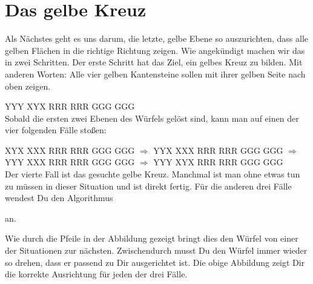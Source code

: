 \section{Das gelbe Kreuz}
\parbox{0.7\linewidth}{
  Als Nächstes geht es uns darum, die letzte, gelbe Ebene so auszurichten, dass alle gelben Flächen in die richtige Richtung zeigen. 
  Wie angekündigt machen wir das in zwei Schritten.
  Der erste Schritt hat das Ziel, ein gelbes Kreuz zu bilden.
  Mit anderen Worten: Alle vier gelben Kantensteine sollen mit ihrer gelben Seite nach oben zeigen.
}
\RubikCubeGreyAll%
            {Y}{Y}{Y}
            {X}{Y}{X}%
               {R}{R}{R}
	       {R}{R}{R}%
	       {G}{G}{G}
	       {G}{G}{G}%
\\[1em]

Sobald die ersten zwei Ebenen des Würfels gelöst sind, kann man auf einen der vier folgenden Fälle stoßen:

\RubikCubeGreyAll%
            {X}{Y}{X}
            {X}{X}{X}%
               {R}{R}{R}
	       {R}{R}{R}%
	       {G}{G}{G}
	       {G}{G}{G}%
$\Longrightarrow$
\RubikCubeGreyAll%
            {Y}{Y}{X}
            {X}{X}{X}%
               {R}{R}{R}
	       {R}{R}{R}%
	       {G}{G}{G}
	       {G}{G}{G}%
$\Longrightarrow$
\RubikCubeGreyAll%
            {Y}{Y}{Y}
            {X}{X}{X}%
               {R}{R}{R}
	       {R}{R}{R}%
	       {G}{G}{G}
	       {G}{G}{G}%
$\Longrightarrow$
\RubikCubeGreyAll%
            {Y}{Y}{Y}
            {X}{Y}{X}%
               {R}{R}{R}
	       {R}{R}{R}%
	       {G}{G}{G}
	       {G}{G}{G}%
\\[1em]

Der vierte Fall ist das gesuchte gelbe Kreuz.
Manchmal ist man ohne etwas tun zu müssen in dieser Situation und ist direkt fertig.
Für die anderen drei Fälle wendest Du den Algorithmus \\[1em]
\begin{center}
\end{center}
an.

Wie durch die Pfeile in der Abbildung gezeigt bringt dies den Würfel von einer der Situationen zur nächsten.
Zwischendurch musst Du den Würfel immer wieder so drehen, dass er passend zu Dir ausgerichtet ist. 
Die obige Abbildung zeigt Dir die korrekte Ausrichtung für jeden der drei Fälle.
